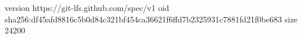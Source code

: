 version https://git-lfs.github.com/spec/v1
oid sha256:df45afd8816c5b0d84c321bf454ca36621f6ffd7b2325931c7881fd21f0be683
size 24200
